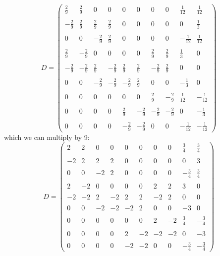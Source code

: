 \[
D=
\left(
\begin{array}{cccccccccc}
\frac29 & \frac29 & 0 & 0 & 0 & 0 & 0 & 0 & \frac{1}{12} & \frac{1}{12} \\ \\
-\frac29 & \frac29 & \frac29 & \frac29 & 0 & 0 & 0 & 0 & 0 & \frac13 \\ \\
0 & 0 & -\frac29 & \frac29 & 0 & 0 & 0 & 0 & -\frac{1}{12} & \frac{1}{12} \\ \\
\frac29 & -\frac29 & 0 & 0 & 0 & 0 & \frac29 & \frac29 & \frac13  & 0 \\ \\ 
-\frac29 & -\frac29 & \frac29 & -\frac29 & \frac29 & \frac29 & -\frac29 & \frac29  &0 &0\\ \\
0 & 0 & -\frac29 & -\frac29 & -\frac29 & \frac29 & 0 & 0 & -\frac13 & 0 \\ \\
0 & 0 & 0 & 0 & 0 & 0 & \frac29 & -\frac29 & \frac{1}{12} & -\frac{1}{12} \\ \\
0 & 0 & 0 & 0 & \frac29 & -\frac29 & -\frac29 & -\frac29 & 0 & -\frac13 \\ \\ 
0 & 0 & 0 & 0 & -\frac29 & -\frac29 & 0 & 0 & -\frac{1}{12} & -\frac{1}{12}
\end{array}
\right)
\]
which we can multiply by 9: 
\[
D=
\left(
\begin{array}{cccccccccc}
2 & 2 & 0 & 0 & 0 & 0 & 0 & 0 & \frac{3}{4} & \frac{3}{4} \\ \\
-2 & 2 & 2 & 2 & 0 & 0 & 0 & 0 & 0 & 3 \\ \\
0 & 0 & -2 & 2 & 0 & 0 & 0 & 0 & -\frac{3}{4} & \frac{3}{4} \\ \\
2 & -2 & 0 & 0 & 0 & 0 & 2 & 2 & 3  & 0 \\ \\ 
-2 & -2 & 2 & -2 & 2 & 2 & -2 & 2  &0 &0\\ \\
0 & 0 & -2 & -2 & -2 & 2 & 0 & 0 & -3 & 0 \\ \\
0 & 0 & 0 & 0 & 0 & 0 & 2 & -2 & \frac{3}{4} & -\frac{3}{4} \\ \\
0 & 0 & 0 & 0 & 2 & -2 & -2 & -2 & 0 & -3 \\ \\ 
0 & 0 & 0 & 0 & -2 & -2 & 0 & 0 & -\frac{3}{4} & -\frac{3}{4}
\end{array}
\right)
\]


